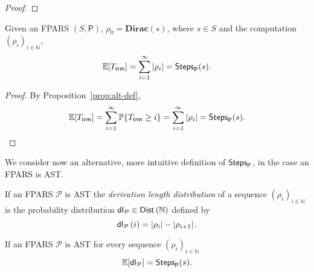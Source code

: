 \begin{LONG}
\begin{proof}
	\end{proof}
	\begin{proposition}
		Given an FPARS $(S,\mathsf{P})$, $\rho_0=\mathbf{Dirac}(s)$,
		where $s\in S$ and the computation $(\rho_i)_{i\in\mathbb{N}}$,
		$$
		\mathbb{E} [ T_{\mathsf{trm}}]=\sum\limits_{i=1}^{\infty} \left|\rho_i\right|=\textsf{Steps}_{\mathsf{P}}(s).
		$$
	\end{proposition}
	\begin{proof}
		By Proposition~\ref{prop:alt-def}, 
		$$
		\mathbb{E} [ T_{\mathsf{trm}}]=\sum\limits_{i=1}^{\infty} \mathbb{P}\{T_{\mathsf{trm}}\geq i\}=\sum\limits_{i=1}^{\infty} \left|\rho_i\right|=\textsf{Steps}_{\mathsf{P}}(s).
		$$
	\end{proof}
	We consider now an alternative, more intuitive definition of $\textsf{Steps}_{\mathsf{P}}$, in the case an FPARS is AST.
	\begin{definition}
		If an FPARS $\mathcal{P}$ is AST the \emph{derivation length distribution} of a sequence $(\rho_i)_{i\in\mathbb{N}}$ is the probability distribution $\mathsf{dl_\mathcal{P}}\in\textsf{Dist}\left(\mathbb{N}\right)$ defined by
		$$
		\mathsf{dl_\mathcal{P}}\left( i\right) =\left|\rho_i\right| -\left|\rho_{i+1}\right|.
		$$
	\end{definition}
	\begin{proposition}\label{proposition:claudio}
		If an FPARS $\mathcal{P}$ is AST for every sequence $(\rho_i)_{i\in\mathbb{N}}$
		$$
		\mathbb{E}[\mathsf{dl_\mathcal{P}}]=\textsf{Steps}_{\mathsf{P}}(s).
		$$
	\end{proposition}

\end{LONG}
